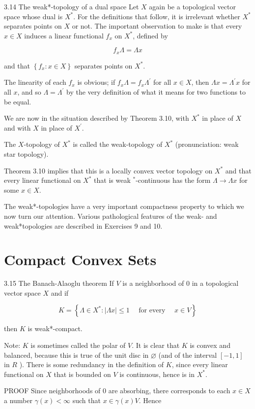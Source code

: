\documentclass[10pt]{article}
\begin{document}
3.14 The weak*-topology of a dual space Let $X$ again be a topological vector space whose dual is $X^{*}$. For the definitions that follow, it is irrelevant whether $X^{*}$ separates points on $X$ or not. The important observation to make is that every $x \in X$ induces a linear functional $f_{x}$ on $X^{*}$, defined by

$$
f_{x} \Lambda=\Lambda x
$$

and that $\left\{f_{x}: x \in X\right\}$ separates points on $X^{*}$.

The linearity of each $f_{x}$ is obvious; if $f_{x} \Lambda=f_{x} \Lambda^{\prime}$ for all $x \in X$, then $\Lambda x=\Lambda^{\prime} x$ for all $x$, and so $\Lambda=\Lambda^{\prime}$ by the very definition of what it means for two functions to be equal.

We are now in the situation described by Theorem 3.10, with $X^{*}$ in place of $X$ and with $X$ in place of $X^{\prime}$.

The $X$-topology of $X^{*}$ is called the weak-topology of $X^{*}$ (pronunciation: weak star topology).

Theorem 3.10 implies that this is a locally convex vector topology on $X^{*}$ and that every linear functional on $X^{*}$ that is weak $^{*}$-continuous has the form $\Lambda \rightarrow \Lambda x$ for some $x \in X$.

The weak*-topologies have a very important compactness property to which we now turn our attention. Various pathological features of the weak- and weak*topologies are described in Exercises 9 and 10.

\section{Compact Convex Sets}
3.15 The Banach-Alaoglu theorem If $V$ is a neighborhood of 0 in a topological vector space $X$ and if

$$
K=\left\{\Lambda \in X^{*}:|\Lambda x| \leq 1 \quad \text { for every } \quad x \in V\right\}
$$

then $K$ is weak*-compact.

Note: $K$ is sometimes called the polar of $V$. It is clear that $K$ is convex and balanced, because this is true of the unit disc in $\varnothing$ (and of the interval $[-1,1]$ in $R$ ). There is some redundancy in the definition of $K$, since every linear functional on $X$ that is bounded on $V$ is continuous, hence is in $X^{*}$.

PROOF Since neighborhoods of 0 are absorbing, there corresponds to each $x \in X$ a number $\gamma(x)<\infty$ such that $x \in \gamma(x) V$. Hence
\end{document}
